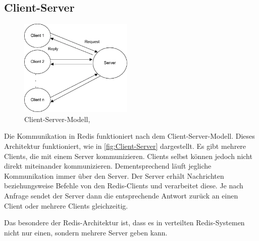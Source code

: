 
\subsection{Client-Server}
\label{sec:Client-Server}
\begin{figure}
    \centering
    \includegraphics[width=0.48\textwidth]{images/Client-Server.png}
    \caption{Client-Server-Modell, \cite[23]{Bengel2014}}
    \label{fig:Client-Server}
\end{figure}
Die Kommunikation in Redis funktioniert nach dem Client-Server-Modell.
Dieses Architektur funktioniert, wie in \autoref{fig:Client-Server} dargestellt.
Es gibt mehrere Clients, die mit einem Server kommunizieren. 
Clients selbst können jedoch nicht direkt miteinander kommunizieren.
Dementsprechend läuft jegliche Kommunikation immer über den Server.
Der Server erhält Nachrichten beziehungsweise Befehle von den Redis-Clients und verarbeitet diese. 
Je nach Anfrage sendet der Server dann die entsprechende Antwort zurück an einen Client oder mehrere Clients gleichzeitig.

Das besondere der Redis-Architektur ist, dass es in verteilten Redis-Systemen nicht nur einen, sondern mehrere Server geben kann.



